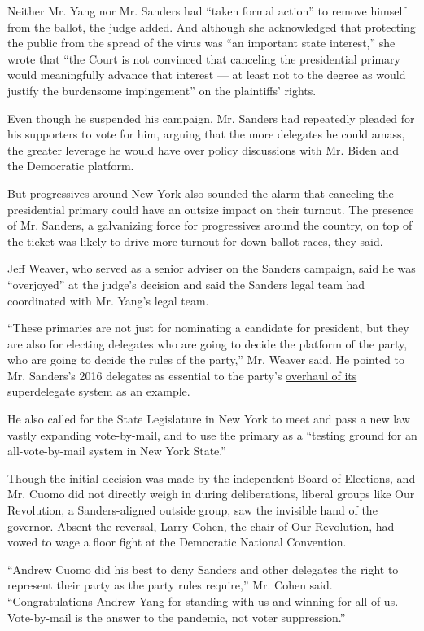 Neither Mr. Yang nor Mr. Sanders had ``taken formal action'' to remove
himself from the ballot, the judge added. And although she acknowledged
that protecting the public from the spread of the virus was ``an
important state interest,'' she wrote that ``the Court is not convinced
that canceling the presidential primary would meaningfully advance that
interest --- at least not to the degree as would justify the burdensome
impingement'' on the plaintiffs' rights.

Even though he suspended his campaign, Mr. Sanders had repeatedly
pleaded for his supporters to vote for him, arguing that the more
delegates he could amass, the greater leverage he would have over policy
discussions with Mr. Biden and the Democratic platform.

But progressives around New York also sounded the alarm that canceling
the presidential primary could have an outsize impact on their turnout.
The presence of Mr. Sanders, a galvanizing force for progressives around
the country, on top of the ticket was likely to drive more turnout for
down-ballot races, they said.

Jeff Weaver, who served as a senior adviser on the Sanders campaign,
said he was ``overjoyed'' at the judge's decision and said the Sanders
legal team had coordinated with Mr. Yang's legal team.

``These primaries are not just for nominating a candidate for president,
but they are also for electing delegates who are going to decide the
platform of the party, who are going to decide the rules of the party,''
Mr. Weaver said. He pointed to Mr. Sanders's 2016 delegates as essential
to the party's
\href{https://www.nytimes3xbfgragh.onion/2018/08/25/us/politics/superdelegates-democrats-dnc.html}{overhaul
of its superdelegate system} as an example.

He also called for the State Legislature in New York to meet and pass a
new law vastly expanding vote-by-mail, and to use the primary as a
``testing ground for an all-vote-by-mail system in New York State.''

Though the initial decision was made by the independent Board of
Elections, and Mr. Cuomo did not directly weigh in during deliberations,
liberal groups like Our Revolution, a Sanders-aligned outside group, saw
the invisible hand of the governor. Absent the reversal, Larry Cohen,
the chair of Our Revolution, had vowed to wage a floor fight at the
Democratic National Convention.

``Andrew Cuomo did his best to deny Sanders and other delegates the
right to represent their party as the party rules require,'' Mr. Cohen
said. ``Congratulations Andrew Yang for standing with us and winning for
all of us. Vote-by-mail is the answer to the pandemic, not voter
suppression.''

